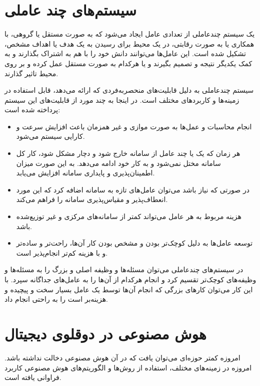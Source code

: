\section{سیستم‌های چند ‌عاملی}
یک سیستم چندعاملی از تعدادی عامل ایجاد می‌شود که به صورت مستقل یا گروهی، با همکاری یا به صورت رقابتی، در یک محیط برای رسیدن به یک هدف یا اهداف مشخص، تشکیل شده است. این عامل‌ها می‌توانند دانش خود را با هم به اشتراک بگذارند و به کمک یکدیگر نتیجه و تصمیم بگیرند و یا هرکدام به صورت مستقل عمل کرده و بر روی محیط تاثیر گذارند.

سیستم‌ چندعاملی به دلیل قابلیت‌های منحصربه‌فردی که ارائه می‌دهد، قابل استفاده در زمینه‌ها و کاربرد‌های مختلف است. در اینجا به چند مورد از قابلیت‌های این سیستم ‌پرداخته‌ شده است:
\cite{b5}

\begin{itemize}
	\item
	انجام محاسبات و عمل‌ها به صورت موازی و غیر همزمان باعث افزایش سرعت و کارایی سیستم می‌شود.
	\item 
	هر زمان که یک یا چند عامل از سامانه خارج شود و دچار مشکل شود، کار کل سامانه مختل نمی‌شود و به کار خود ادامه می‌دهد. به این صورت میزان اطمینان‌پذیری و پایداری سامانه افزایش می‌یابد.
	
	\item
	در صورتی که نیاز باشد می‌توان عامل‌های تازه به سامانه اضافه کرد که این مورد انعطاف‌پذیر و مقیاس‌پذیری سامانه را فراهم می‌کند.
	
	\item 
	هزینه مربوط به هر عامل می‌تواند کمتر از سامانه‌های مرکزی و غیر توزیع‌شده باشد.
	\item 
	توسعه عامل‌ها به دلیل کوچک‌تر بودن و مشخص بودن کار آن‌ها، راحت‌تر و ساده‌تر و با هزینه کم‌تر انجام‌پذیر است.
	
\end{itemize}

در سیستم‌‌های چندعاملی می‌توان مسئله‌ها و وظیفه اصلی و بزرگ را به مسئله‌ها و وظیفه‌های کوچک‌تر تقسیم کرد و انجام هرکدام از آن‌ها را به عامل‌های جداگانه سپرد. با این کار می‌توان کار‌های بزرگی که انجام آن‌ها توسط یک عامل بسیار سخت و پیچیده  و هزینه‌بر است را به راحتی انجام داد.
\cite{b6}

\section{هوش مصنوعی در دوقلو‌ی دیجیتال}

امروزه کمتر حوزه‌ای می‌توان یافت که در آن هوش مصنوعی دخالت نداشته‌ باشد. امروزه در زمینه‌های مختلف، استفاده از روش‌ها و الگوریتم‌های هوش مصنوعی کاربرد فراوانی یافته است. 

